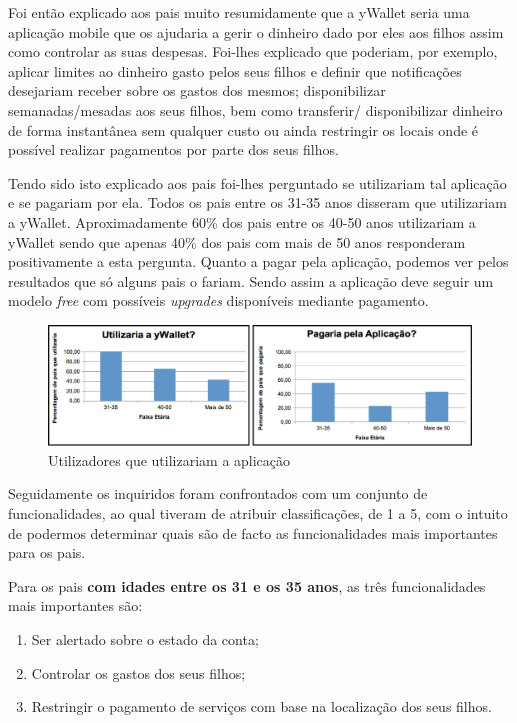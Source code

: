 \documentclass[12pt,a4paper]{article}
\begin{document}
      Foi então explicado aos pais muito resumidamente que a yWallet seria uma aplicação mobile que os ajudaria a gerir o dinheiro dado por eles aos filhos assim como controlar as suas despesas. Foi-lhes explicado que poderiam, por exemplo, aplicar limites ao dinheiro gasto pelos seus filhos e definir que notificações desejariam receber sobre os gastos dos mesmos; disponibilizar semanadas/mesadas aos seus filhos, bem como transferir/ disponibilizar dinheiro de forma instantânea sem qualquer custo ou ainda restringir os locais onde é possível realizar pagamentos por parte dos seus filhos. 

      Tendo sido isto explicado aos pais foi-lhes perguntado se utilizariam tal aplicação e se pagariam por ela. Todos os pais entre os 31-35 anos disseram que utilizariam a yWallet. Aproximadamente 60\% dos pais entre os 40-50 anos utilizariam a yWallet sendo que apenas 40\% dos pais com mais de 50 anos responderam positivamente a esta pergunta. Quanto a pagar pela aplicação, podemos ver pelos resultados que só alguns pais o fariam. Sendo assim a aplicação deve seguir um modelo \emph{free} com possíveis \emph{upgrades} disponíveis mediante pagamento.

      \begin{figure}[ht!]
        \centering
          \includegraphics[width=0.7\linewidth]{img/img11}
          \caption{Utilizadores que utilizariam a aplicação}
          \label{img11}
      \end{figure}

      Seguidamente os inquiridos foram confrontados com um conjunto de funcionalidades, ao qual tiveram de atribuir classificações, de 1 a 5, com o intuito de podermos determinar quais são de facto as funcionalidades mais importantes para os pais.

      Para os pais \textbf{com idades entre os 31 e os 35 anos}, as três funcionalidades mais importantes são:

      \begin{enumerate}
        \item Ser alertado sobre o estado da conta;
        \item Controlar os gastos dos seus filhos;
        \item Restringir o pagamento de serviços com base na localização dos seus filhos.
      \end{enumerate} 
\end{document}
